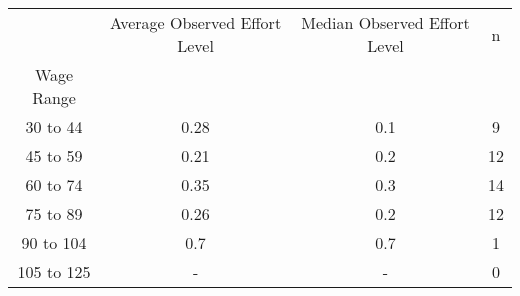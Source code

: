 \begin{tabular}{cccc}
\toprule
{} & Average Observed Effort Level & Median Observed Effort Level &   n \\
Wage Range &                               &                              &     \\
\midrule
30 to 44   &                          0.28 &                          0.1 &   9 \\
45 to 59   &                          0.21 &                          0.2 &  12 \\
60 to 74   &                          0.35 &                          0.3 &  14 \\
75 to 89   &                          0.26 &                          0.2 &  12 \\
90 to 104  &                           0.7 &                          0.7 &   1 \\
105 to 125 &                             - &                            - &   0 \\
\bottomrule
\end{tabular}
